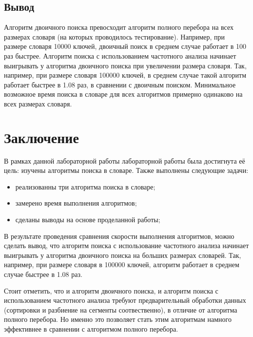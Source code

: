 \documentclass[12pt]{report}
\begin{document}
\section*{Вывод}
	
Алгоритм двоичного поиска превосходит алгоритм полного перебора на всех размерах словаря (на которых проводилось тестирование). Например, при размере словаря 10000 ключей, двоичный поиск в среднем случае работает в 100 раз быстрее. 
Алгоритм поиска с использованием частотного анализа начинает выигрывать у алгоритма двоичного поиска при увеличении размера словаря. Так, например, при размере словаря 100000 ключей, в среднем случае такой алгоритм работает быстрее в 1.08 раз, в сравнении с двоичным поиском. 
Минимальное возможное время поиска в словаре для всех алгоритмов примерно одинаково на всех размерах словаря.

\chapter*{Заключение}
	
В рамках данной лабораторной работы лабораторной работы была достигнута её цель: изучены алгоритмы поиска в словаре. Также выполнены следующие задачи:
	
\begin{itemize}
	\item реализованны три алгоритма поиска в словаре;
	\item замерено время выполнения алгоритмов;
	\item сделаны выводы на основе проделанной работы;
\end{itemize}

В результате проведения сравнения скорости выполнения алгоритмов, можно сделать вывод, что алгоритм поиска с использование частотного анализа начинает выигрывать у алгоритма двоичного поиска на больших размерах словарей. Так, например, при размере словаря в 100000 ключей, алгоритм работает в среднем случае быстрее в 1.08 раз. 

Стоит отметить, что и алгоритм двоичного поиска, и алгоритм поиска с использованием частотного анализа требуют предварительный обработки данных (сортировки и разбиение на сегменты соотвественно), в отличие от алгоритма полного перебора. Но именно это позволяет стать этим алгоритмам намного эффективнее в сравнении с алгоритмом полного перебора.

	
\end{document}
